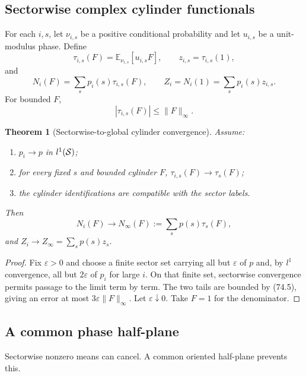 \documentclass[11pt]{article}
\newtheorem{theorem}{Theorem}[section]
\begin{document}
\subsection{Sectorwise complex cylinder functionals}

For each \(i,s\), let \(\nu_{i,s}\) be a positive conditional
probability and let \(u_{i,s}\) be a unit-modulus phase.  Define
\[
 \tau_{i,s}(F)
       ={\mathbb E}_{\nu_{i,s}}[u_{i,s}F],\qquad
 z_{i,s}=\tau_{i,s}(1),                                      \tag{74.3}
\]
and
\[
 N_i(F)=\sum_sp_i(s)\tau_{i,s}(F),\qquad
 Z_i=N_i(1)=\sum_sp_i(s)z_{i,s}.                             \tag{74.4}
\]
For bounded \(F\),
\[
                              |\tau_{i,s}(F)|\le\lVert F\rVert_\infty.
                                                                  \tag{74.5}
\]

\begin{theorem}[Sectorwise-to-global cylinder convergence]
\label{thm:v11v74-global}
Assume:
\begin{enumerate}
\item \(p_i\to p\) in \(l^1({\cal S})\);
\item for every fixed \(s\) and bounded cylinder \(F\),
\(\tau_{i,s}(F)\to\tau_s(F)\);
\item the cylinder identifications are compatible with the sector
labels.
\end{enumerate}
Then
\[
                         N_i(F)\longrightarrow
                         N_\infty(F):=\sum_sp(s)\tau_s(F),    \tag{74.6}
\]
and \(Z_i\to Z_\infty=\sum_sp(s)z_s\).
\end{theorem}

\begin{proof}
Fix \(\varepsilon>0\) and choose a finite sector set carrying all but
\(\varepsilon\) of \(p\) and, by \(l^1\) convergence, all but
\(2\varepsilon\) of \(p_i\) for large \(i\).  On that finite set,
sectorwise convergence permits passage to the limit term by term.
The two tails are bounded by (74.5), giving an error at most
\(3\varepsilon\lVert F\rVert_\infty\).  Let
\(\varepsilon\downarrow0\).  Take \(F=1\) for the denominator.
\end{proof}

\subsection{A common phase half-plane}

Sectorwise nonzero means can cancel.  A common oriented half-plane
prevents this.
\end{document}
